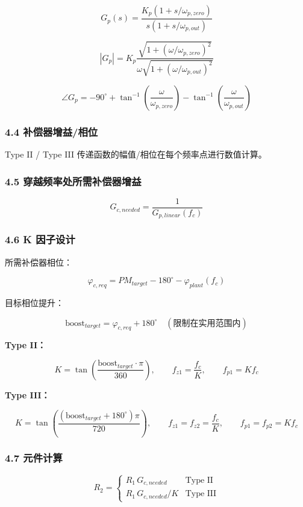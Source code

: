 \documentclass[UTF8]{ctexart}
\begin{document}
\[
G_p(s) = \frac{K_p(1 + s/\omega_{p,zero})}{s(1 + s/\omega_{p,out})}
\]

\[
|G_p| = K_p \frac{\sqrt{1 + (\omega/\omega_{p,zero})^{2}}}{\omega \sqrt{1 + (\omega/\omega_{p,out})^{2}}}
\]

\[
\angle G_p = -90^{\circ} + \tan^{-1}\left(\frac{\omega}{\omega_{p,zero}}\right) - \tan^{-1}\left(\frac{\omega}{\omega_{p,out}}\right)
\]

\subsubsection*{4.4 补偿器增益/相位}

Type II / Type III 传递函数的幅值/相位在每个频率点进行数值计算。

\subsubsection*{4.5 穿越频率处所需补偿器增益}

\[
G_{c,needed} = \frac{1}{G_{p,linear}(f_c)}
\]

\subsubsection*{4.6 K 因子设计}

所需补偿器相位：

\[
\varphi_{c,req} = PM_{target} - 180^{\circ} - \varphi_{plant}(f_c)
\]

目标相位提升：

\[
\text{boost}_{target} = \varphi_{c,req} + 180^{\circ}\quad (\text{限制在实用范围内})
\]

\textbf{Type II：}

\[
K = \tan\left(\frac{\text{boost}_{target} \cdot \pi}{360}\right),\qquad
f_{z1} = \frac{f_c}{K},\qquad
f_{p1} = K f_c
\]

\textbf{Type III：}

\[
K = \tan\left(\frac{(\text{boost}_{target} + 180^{\circ})\pi}{720}\right),\qquad
f_{z1}=f_{z2}=\frac{f_c}{K},\qquad
f_{p1}=f_{p2}=K f_c
\]

\subsubsection*{4.7 元件计算}

\[
R_2 = \begin{cases}
R_1 \, G_{c,needed} & \text{Type II} \\[4pt]
R_1 \, G_{c,needed} / K & \text{Type III}
\end{cases}
\]
\end{document}
